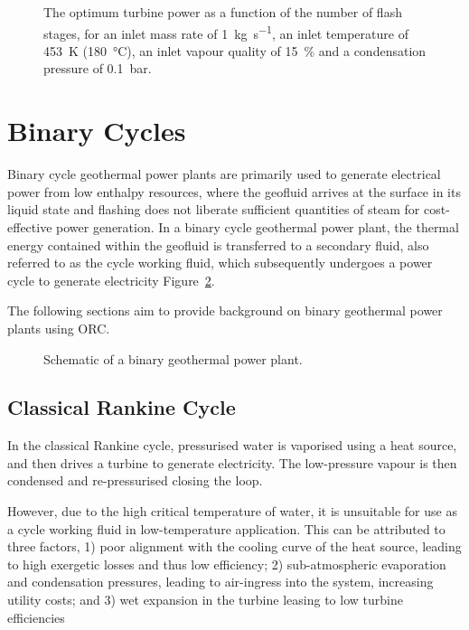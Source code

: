              \begin{figure}[H]
                \centering
                
                \caption[The optimum turbine power as a function of the number of flash stages.]{The optimum turbine power as a function of the number of flash stages, for an inlet mass rate of \qty{1}{\kg\per\s}, an inlet temperature of \qty{453}{\K} (\qty{180}{\degreeCelsius}), an inlet vapour quality of \qty{15}{\percent} and a condensation pressure of \qty{0.1}{\bar}.}
                \label{fig:litrev_stagesflash_opt}
            \end{figure}

\section{Binary Cycles}
    Binary cycle geothermal power plants are primarily used to generate electrical power from low enthalpy resources, where the geofluid arrives at the surface in its liquid state and flashing does not liberate sufficient quantities of steam for cost-effective power generation. In a binary cycle geothermal power plant, the thermal energy contained within the geofluid is transferred to a secondary fluid, also referred to as the cycle working fluid, which subsequently undergoes a power cycle to generate electricity Figure~\ref{fig:litrev_binary_schematic}.

    The following sections aim to provide background on binary geothermal power plants using \acf{ORC}.

    \begin{figure}[H]
        \centering
        
        \caption{Schematic of a binary geothermal power plant.}
        \label{fig:litrev_binary_schematic}
    \end{figure}

    \subsection{Classical Rankine Cycle}
        In the classical Rankine cycle, pressurised water is vaporised using a heat source, and then drives a turbine to generate electricity. The low-pressure vapour is then condensed and re-pressurised closing the loop.

        However, due to the high critical temperature of water, it is unsuitable for use as a cycle working fluid in low-temperature application. This can be attributed to three factors, 1) poor alignment with the cooling curve of the heat source, leading to high exergetic losses and thus low efficiency; 2) sub-atmospheric evaporation and condensation pressures, leading to air-ingress into the system, increasing utility costs; and 3) wet expansion in the turbine leasing to low turbine efficiencies

